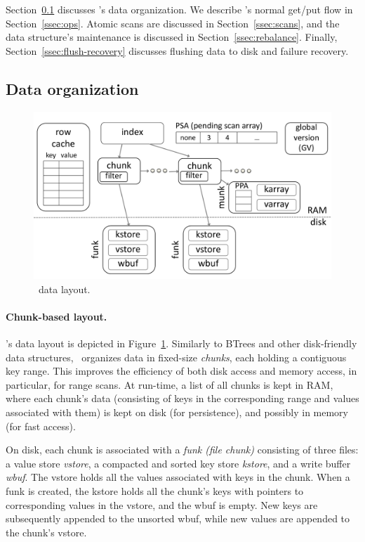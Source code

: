 
Section~\ref{ssec:layout}  discusses \sys's data organization. 
We describe  \sys's normal get/put flow in Section~\ref{ssec:ops}.  
Atomic scans are discussed in Section~\ref{ssec:scans}, and 
the data structure's maintenance is discussed in Section~\ref{ssec:rebalance}.
Finally, Section~\ref{ssec:flush-recovery} discusses flushing data to disk and failure recovery.


\subsection{Data organization}
\label{ssec:layout}

\begin{figure}[htb]
\centerline{
\includegraphics[width=\columnwidth]{PiWi.pdf}
}
\caption{\sys\ data layout.}
\label{fig:layout}
\end{figure}

\paragraph{Chunk-based layout.}

\sys's data layout is depicted in Figure~\ref{fig:layout}.
Similarly to BTrees {and other disk-friendly data structures}, 
\sys\ organizes data in fixed-size \emph{chunks}, each holding a contiguous key range.
This improves the efficiency of both disk access and memory access, in particular, for  range scans. 
At run-time, a list of all chunks is kept in RAM, where each chunk's data 
(consisting of keys in the corresponding range and values associated with them) 
is kept on disk (for persistence), and possibly in memory (for fast access). 

On disk, each chunk is associated with a  \emph{funk (file chunk)} 
consisting of three files:  a value store \emph{vstore}, 
a compacted and sorted  key store \emph{kstore}, and a write buffer \emph{wbuf}. The vstore holds all the values associated with keys
in the chunk. When a funk is created, the kstore holds all the chunk's keys with pointers to corresponding values in the vstore, and the wbuf is empty.
New keys are subsequently appended to the unsorted wbuf, while new values are appended to the chunk's vstore.


